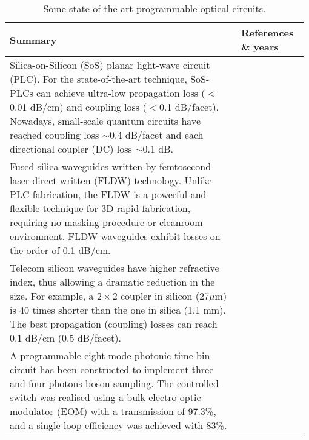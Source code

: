 \begin{table*}[!htbp]
	\begin{tabular}{|p{0.755\linewidth}|p{0.22\linewidth}|}
		\hline
		Summary & References \& years \\
		\hline \hline
		Silica-on-Silicon (SoS) planar light-wave circuit (PLC). For the state-of-the-art technique, SoS-PLCs can achieve ultra-low propagation loss ($<$0.01 dB/cm) and coupling loss ($<$0.1 dB/facet). Nowadays, small-scale quantum circuits have reached coupling loss $\sim$0.4 dB/facet and each directional coupler (DC) loss $\sim$0.1 dB. &  \cite{bib:hibino2003silica, bib:carolan2015universal} \\
		\hline
		Fused silica waveguides written by femtosecond laser direct written (FLDW) technology. Unlike PLC fabrication, the FLDW is a powerful and flexible technique for 3D rapid fabrication, requiring no masking procedure or cleanroom environment. FLDW waveguides exhibit losses on the order of 0.1 dB/cm. & \cite{bib:sakuma2003ultra} \\
		\hline
		Telecom silicon waveguides have higher refractive index, thus allowing a dramatic reduction in the size. For example, a $2 \times 2$ coupler in silicon (27$\mu$m) is 40 times shorter than the one in silica (1.1 mm). The best propagation (coupling) losses can reach 0.1 dB/cm (0.5 dB/facet). &  \cite{bib:bonneau2012quantum, bib:lee2000, bib:almeida2003, bib:mcnab2003} \\
		\hline
		A programmable eight-mode photonic time-bin circuit has been constructed to implement three and four photons boson-sampling. The controlled switch was realised using a bulk electro-optic modulator (EOM) with a transmission of 97.3\%, and a single-loop efficiency was achieved with 83\%.  & \cite{bib:he2017time} \\
		\hline
	\end{tabular}
	\captionspacetab \caption{Some state-of-the-art programmable optical circuits.} \label{tab:waveguide_fibre}
\end{table*}

